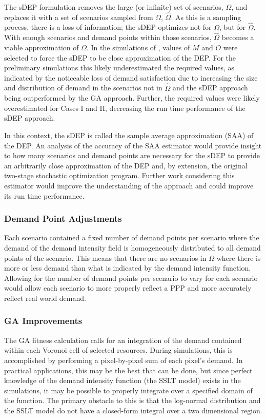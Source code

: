 \documentclass[12pt,dvipsnames]{report}
\begin{document}
The sDEP formulation removes the large (or infinite) set of scenarios, $\Omega$, and replaces it with a set of scenarios sampled from $\Omega$, $\hat{\Omega}$.  As this is a sampling process, there is a loss of information; the sDEP optimizes not for $\Omega$, but for $\hat{\Omega}$.  With enough scenarios and demand points within those scenarios, $\hat{\Omega}$ becomes a viable approximation of $\Omega$.  In the simulations of , values of $M$ and $O$ were selected to force the sDEP to be close approximation of the DEP.  For the preliminary simulations this likely underestimated the required values, as indicated by the noticeable loss of demand satisfaction due to increasing the size and distribution of demand in the scenarios not in $\hat{\Omega}$ and the sDEP approach being outperformed by the GA approach.  Further, the required values were likely overestimated for Cases I and II, decreasing the run time performance of the sDEP approach.

In this context, the sDEP is called the sample average approximation (SAA) of the DEP.  An analysis of the accuracy of the SAA estimator would provide insight to how many scenarios and demand points are necessary for the sDEP to provide an arbitrarily close approximation of the DEP and, by extension, the original two-stage stochastic optimization program.  Further work considering this estimator would improve the understanding of the approach and could improve its run time performance.

\subsubsection{Demand Point Adjustments}

Each scenario contained a fixed number of demand points per scenario where the demand of the demand intensity field is homogeneously distributed to all demand points of the scenario.  This means that there are no scenarios in $\Omega$ where there is more or less demand than what is indicated by the demand intensity function.  Allowing for the number of demand points per scenario to vary for each scenario would allow each scenario to more properly reflect a PPP and more accurately reflect real world demand.

\subsubsection{GA Improvements}

The GA fitness calculation calls for an integration of the demand contained within each Voronoi cell of selected resources.  During simulations, this is accomplished by performing a pixel-by-pixel sum of each pixel's demand.  In practical applications, this may be the best that can be done, but since perfect knowledge of the demand intensity function (the SSLT model) exists in the simulations, it may be possible to properly integrate over a specified domain of the function.  The primary obstacle to this is that the log-normal distribution and the SSLT model do not have a closed-form integral over a two dimensional region.
\end{document}

